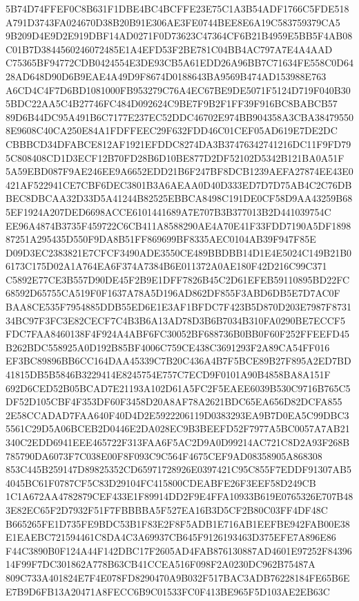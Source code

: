 \documentclass[UTF8,fontset=fandol,zihao=-4,a4paper]{ctexart}
\begin{document}
{{5B74D74FFEF0C8B631F1DBE4BC4BCFFE23E75C1A3B54ADF1766C5FDE518A791D3743FA024670D38B20B91E306AE3FE0744BEE8E6A19C583759379CA5
9B209D4E9D2E919DBF14AD0271F0D73623C47364CF6B21B4959E5BB5F4AB08C01B7D3844560246072485E1A4EFD53F2BE781C04BB4AC797A7E4A4AAD
C75365BF94772CDB0424554E3DE93CB5A61EDD26A96BB7C71634FE558C0D6428AD648D90D6B9EAE4A49D9F8674D0188643BA9569B474AD153988E763
A6CD4C4F7D6BD1081000FB953279C76A4EC67BE9DE5071F5124D719F040B305BDC22AA5C4B27746FC484D092624C9BE7F9B2F1FF39F916BC8BABCB57
89D6B44DC95A491B6C7177E237EC52DDC46702E974BB904358A3CBA384795508E9608C40CA250E84A1FDFFEEC29F632FDD46C01CEF05AD619E7DE2DC
CBBBCD34DFABCE812AF1921EFDDC8274DA3B37476342741216DC11F9FD795C808408CD1D3ECF12B70FD28B6D10BE877D2DF52102D5342B121BA0A51F
5A59EBD087F9AE246EE9A6652EDD21B6F247BF8DCB1239AEFA27874EE43E0421AF522941CE7CBF6DEC3801B3A6AEAA0D40D333ED7D7D75AB4C2C76DB
BEC8DBCAA32D33D5A41244B82525EBBCA8498C191DE0CF58D9AA43259B685EF1924A207DED6698ACCE6101441689A7E707B3B377013B2D441039754C
EE96A4874B3735F459722C6CB411A8588290AE4A70E41F33FDD7190A5DF189887251A295435D550F9DA8B51FF869699BF8335AEC0104AB39F947F85E
D09D3EC2383821E7CFCF3490ADE3550CE489BBDBB14D1E4E5024C149B21B06173C175D02A1A764EA6F374A7384B6E011372A0AE180F42D216C99C371
C5892E77CE3B557D90DE45F2B9E1DFF7826B45C2D61EFEB59110895BD22FC68592D65755CA519F0F1637A78A5D196AD862DF855F3ABD6DB5E7D7AC0F
BAA8CE535F7954885DDB55ED6E1E3AF1BFDC7F423B5D870D203E7987F873134BC97F3FC3E82CECF7C4B3B6A13AD78D3B6B7034B310FA0290BE7ECCF5
FDC7FAA8460138F4F924A4ABF6FC30052BF688736B0BB0F60F252FFEEFD45B262BDC558925A0D192B85BF4006C759CE438C3691293F2A89CA54FF016
EF3BC89896BB6CC164DAA45339C7B20C436A4B7F5BCE89B27F895A2ED7BD41815DB5B5846B3229414E8245754E757C7ECD9F0101A90B4858BA8A151F
692D6CED52B05BCAD7E21193A102D61A5FC2F5EAEE6039B530C9716B765C5DF52D105CBF4F353DF60F3458D20A8AF78A2621BDC65EA656D82DCFA855
2E58CCADAD7FAA640F40D4D2E5922206119D0383293EA9B7D0EA5C99DBC35561C29D5A06BCEB2D0446E2DA028EC9B3BEEFD52F7977A5BC0057A7AB21
340C2EDD6941EEE465722F313FAA6F5AC2D9A0D99214AC721C8D2A93F268B785790DA6073F7C038E00F8F093C9C564F4675CEF9AD08358905A868308
853C445B259147D89825352CD65971728926E0397421C95C855F7EDDF91307AB54045BC61F0787CF5C83D29104FC415800CDEABFE26F3EEF58D249CB
1C1A672AA4782879CEF433E1F89914DD2F9E4FFA10933B619E0765326E707B483E82EC65F2D7932F51F7FBBBBA5F527EA16B3D5CF2B80C03FF4DF48C
B665265FE1D735FE9BDC53B1F83E2F8F5ADB1E716AB1EEFBE942FAB00E38E1EAEBC721594461C8DA4C3A69937CB645F9126193463D375EFE7A896E86
F44C3890B0F124A44F142DBC17F2605AD4FAB876130887AD4601E97252F8439614F99F7DC301862A778B63CB41CCEA516F098F2A0230DC962B75487A
809C733A401824E7F4E078FD8290470A9B032F517BAC3ADB76228184FE65B6EE7B9D6FB13A20471A8FECC6B9C01533FC0F413BE965F5D103AE2EB63C
}}
\end{document}
